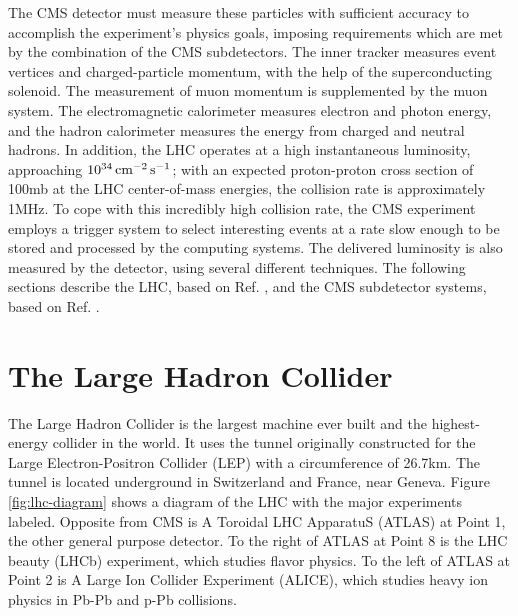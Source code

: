 \documentclass[12pt]{thesis}  %
\begin{document}
The CMS detector must measure these particles with sufficient accuracy to accomplish the experiment's physics goals, imposing requirements which are met by the combination of the CMS subdetectors. The inner tracker measures event vertices and charged-particle momentum, with the help of the superconducting solenoid. The measurement of muon momentum is supplemented by the muon system. The electromagnetic calorimeter measures electron and photon energy, and the hadron calorimeter measures the energy from charged and neutral hadrons. In addition, the LHC operates at a high instantaneous luminosity, approaching $10^{34}\,\text{cm}^\text{$-$2}\,\text{s}^\text{$-$1}$; with an expected proton-proton cross section of 100\unit{mb} at the LHC center-of-mass energies, the collision rate is approximately 1\unit{MHz}. To cope with this incredibly high collision rate, the CMS experiment employs a trigger system to select interesting events at a rate slow enough to be stored and processed by the computing systems. The delivered luminosity is also measured by the detector, using several different techniques. The following sections describe the LHC, based on Ref. \cite{LHCmachine}, and the CMS subdetector systems, based on Ref. \cite{CMSJINST}.

\section{The Large Hadron Collider}

The Large Hadron Collider is the largest machine ever built and the highest-energy collider in the world. It uses the tunnel originally constructed for the Large Electron-Positron Collider (LEP) with a circumference of 26.7\unit{km}. The tunnel is located underground in Switzerland and France, near Geneva. Figure \ref{fig:lhc-diagram} shows a diagram of the LHC with the major experiments labeled. Opposite from CMS is A Toroidal LHC ApparatuS (ATLAS) at Point 1, the other general purpose detector. To the right of ATLAS at Point 8 is the LHC beauty (LHCb) experiment, which studies flavor physics. To the left of ATLAS at Point 2 is A Large Ion Collider Experiment (ALICE), which studies heavy ion physics in Pb-Pb and p-Pb collisions.
\end{document}

